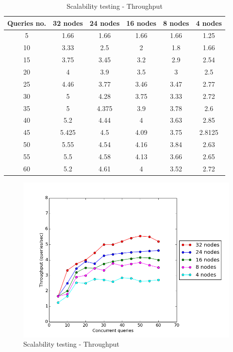 \begin{table}[H]
\begin{center}
\begin{tabular}{|c|c|c|c|c|c|}
\hline
Queries no. & 32 nodes & 24 nodes & 16 nodes & 8 nodes & 4 nodes \\ \hline
5 & 1.66   & 1.66  & 1.66 & 1.66 & 1.25\\ \hline
10 & 3.33  & 2.5   & 2    & 1.8  & 1.66\\ \hline
15 & 3.75  & 3.45  & 3.2  & 2.9  & 2.54\\ \hline
20 & 4     & 3.9   & 3.5  & 3    & 2.5\\ \hline
25 & 4.46  & 3.77  & 3.46 & 3.47 & 2.77\\ \hline
30 & 5     & 4.28  & 3.75 & 3.33 & 2.72\\ \hline
35 & 5     & 4.375 & 3.9  & 3.78 & 2.6 \\ \hline
40 & 5.2   & 4.44  & 4    & 3.63 & 2.85 \\ \hline
45 & 5.425 & 4.5   & 4.09 & 3.75 & 2.8125 \\ \hline
50 & 5.55  & 4.54  & 4.16 & 3.84 & 2.63 \\ \hline
55 & 5.5   & 4.58  & 4.13 & 3.66 & 2.65 \\ \hline
60 & 5.2   & 4.61  & 4    & 3.52 & 2.72 \\ \hline
\end{tabular}
\end{center}
\caption{Scalability testing - Throughput}
\end{table}

\begin{figure}[H]
  \centering
  \includegraphics[height=0.6\textwidth]{figures/scalability_throughput.png}
  \caption{Scalability testing - Throughput}
\end{figure}


